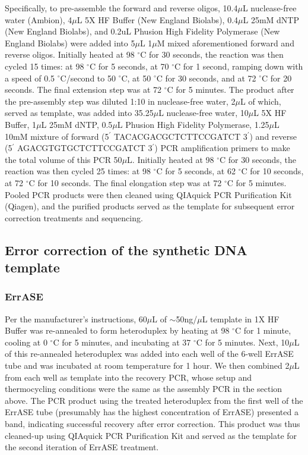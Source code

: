 \documentclass[letterpaper,12pt]{article}
\begin{document}
Specifically, to pre-assemble the forward and reverse oligos, 10.4$\mu$L nuclease-free water (Ambion), 4$\mu$L 5X HF Buffer (New England Biolabs), 0.4$\mu$L 25mM dNTP (New England Biolabs), and 0.2uL Phusion High Fidelity Polymerase (New England Biolabs) were added into 5$\mu$L 1$\mu$M mixed aforementioned forward and reverse oligos. Initially heated at 98 $^{\circ}$C for 30 seconds, the reaction was then cycled 15 times: at 98 $^{\circ}$C for 5 seconds, at 70 $^{\circ}$C for 1 second, ramping down with a speed of 0.5 $^{\circ}$C/second to 50 $^{\circ}$C, at 50 $^{\circ}$C for 30 seconds, and at 72 $^{\circ}$C for 20 seconds. The final extension step was at 72 $^{\circ}$C for 5 minutes.
%
The product after the pre-assembly step was diluted 1:10 in nuclease-free water, 2$\mu$L of which, served as template, was added into 35.25$\mu$L nuclease-free water, 10$\mu$L 5X HF Buffer, 1$\mu$L 25mM dNTP, 0.5$\mu$L Phusion High Fidelity Polymerase, 1.25$\mu$L 10mM mixture of forward (5$^\prime$ TACACGACGCTCTTCCGATCT 3$^\prime$) and reverse (5$^\prime$ AGACGTGTGCTCTTCCGATCT 3$^\prime$) PCR amplification primers to make the total volume of this PCR 50$\mu$L. Initially heated at 98 $^{\circ}$C for 30 seconds, the reaction was then cycled 25 times: at 98 $^{\circ}$C for 5 seconds, at 62 $^{\circ}$C for 10 seconds, at 72 $^{\circ}$C for 10 seconds. The final elongation step was at 72 $^{\circ}$C for 5 minutes. Pooled PCR products were then cleaned using QIAquick PCR Purification Kit (Qiagen), and the purified products served as the template for subsequent error correction treatments and sequencing.

\subsection*{Error correction of the synthetic DNA template}
\subsubsection*{ErrASE}
Per the manufacturer’s instructions, 60$\mu$L of $\sim$50ng/$\mu$L template in 1X HF Buffer was re-annealed to form heteroduplex by heating at 98 $^{\circ}$C for 1 minute, cooling at 0 $^{\circ}$C for 5 minutes, and incubating at 37 $^{\circ}$C for 5 minutes. Next, 10$\mu$L of this re-annealed heteroduplex was added into each well of the 6-well ErrASE tube and was incubated at room temperature for 1 hour. We then combined 2$\mu$L from each well as template into the recovery PCR, whose setup and thermocycling conditions were the same as the assembly PCR in the section above. The PCR product using the treated heteroduplex from the first well of the ErrASE tube (presumably has the highest concentration of ErrASE) presented a band, indicating successful recovery after error correction. This product was thus cleaned-up using QIAquick PCR Purification Kit and served as the template for the second iteration of ErrASE treatment.
\end{document}
